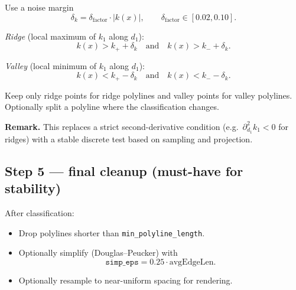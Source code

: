 \documentclass[12pt,a4paper]{article}
\theoremstyle{plain}
\theoremstyle{definition}      %
\begin{document}
	Use a noise margin
	\[
	\delta_k=\delta_{\mathrm{factor}}\cdot |k(x)|,
	\qquad \delta_{\mathrm{factor}}\in[0.02,0.10].
	\]
	
	\emph{Ridge} (local maximum of $k_1$ along $d_1$):
	\[
	k(x)>k_+ + \delta_k
	\quad\text{and}\quad
	k(x)>k_- + \delta_k.
	\]
	
	\emph{Valley} (local minimum of $k_1$ along $d_1$):
	\[
	k(x)<k_+ - \delta_k
	\quad\text{and}\quad
	k(x)<k_- - \delta_k.
	\]
	
	Keep only ridge points for ridge polylines and valley points for valley polylines.
	Optionally split a polyline where the classification changes.
	
	\medskip
	\noindent
	\textbf{Remark.}
	This replaces a strict second-derivative condition (e.g.\ $\partial_{d_1}^2 k_1<0$ for ridges)
	with a stable discrete test based on sampling and projection.
	
	
	\subsection*{Step 5 — final cleanup (must-have for stability)}
	
	After classification:
	
	\begin{itemize}
		\item Drop polylines shorter than \texttt{min\_polyline\_length}.
		\item Optionally simplify (Douglas--Peucker) with
		\[
		\texttt{simp\_eps}=0.25\cdot \mathrm{avgEdgeLen}.
		\]
		\item Optionally resample to near-uniform spacing for rendering.
	\end{itemize}
	
	
	
	
	
\end{document}
